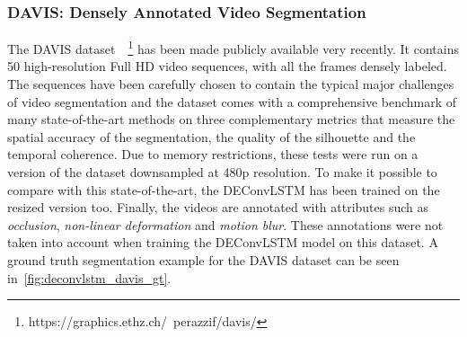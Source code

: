 \subsubsection{DAVIS: Densely Annotated Video Segmentation}
\label{sec:deconvLSTM_davis}
The DAVIS dataset~\citep{Perazzi2016}~\footnote{
https://graphics.ethz.ch/~perazzif/davis/} has been made publicly available
very recently. It contains 50 high-resolution Full HD video sequences, with
all the frames densely labeled. The sequences have been carefully chosen to
contain the typical major challenges of video segmentation and the dataset
comes with a comprehensive benchmark of many state-of-the-art methods on
three complementary metrics that measure the spatial accuracy of the
segmentation, the quality of the silhouette and the temporal coherence. Due to
memory restrictions, these tests were run on a version of the dataset
downsampled at 480p resolution. To make it possible to compare with this
state-of-the-art, the DEConvLSTM has been trained on the resized version too.
Finally, the videos are annotated with attributes such as \textit{occlusion},
\textit{non-linear deformation} and \textit{motion blur}. These annotations
were not taken into account when training the DEConvLSTM model on this dataset.
A ground truth segmentation example for the DAVIS dataset can be seen
in~\autoref{fig:deconvlstm_davis_gt}.

